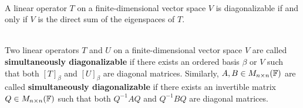 \begin{theorem}
	\hfill\\
	A linear operator $T$ on a finite-dimensional vector space $V$ is diagonalizable if and only if $V$ is the direct sum of the eigenspaces of $T$.
\end{theorem}

\begin{definition}
	\hfill\\
	Two linear operators $T$ and $U$ on a finite-dimensional vector space $V$ are called \textbf{simultaneously diagonalizable} if there exists an ordered basis $\beta$ or $V$ such that both $[T]_\beta$ and $[U]_\beta$ are diagonal matrices. Similarly, $A, B \in M_{n \times n}(\mathbb{F})$ are called \textbf{simultaneously diagonalizable} if there exists an invertible matrix $Q \in M_{n \times n}(\mathbb{F})$ such that both $Q^{-1}AQ$ and $Q^{-1}BQ$ are diagonal matrices.
\end{definition}
